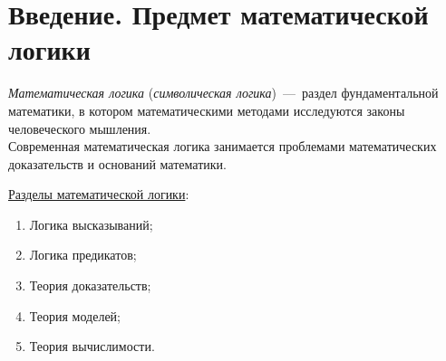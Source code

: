 \clearpage
{}
\setcounter{page}{1}
\section*{Введение. Предмет математической логики}
\textit{Математическая логика} (\textit{символическая логика})~---~раздел фундаментальной математики, в котором математическими методами исследуются законы человеческого мышления. \\
Современная математическая логика занимается проблемами математических доказательств и оснований математики.


\underline{Разделы математической логики}:
\begin{enumerate}
    \item Логика высказываний;
    \item Логика предикатов;
    \item Теория доказательств;
    \item Теория моделей;
    \item Теория вычислимости.
\end{enumerate}